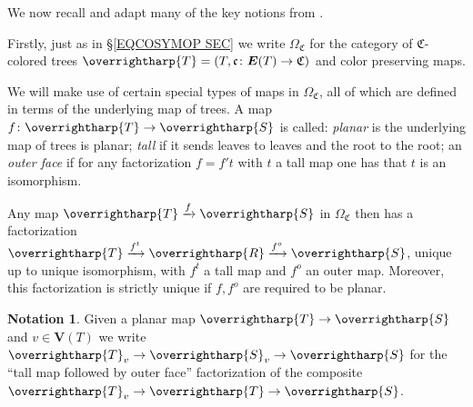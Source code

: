 \documentclass[a4paper,10pt
,draft
]{article}%
\numberwithin{equation}{section}
\numberwithin{figure}{section}
\theoremstyle{definition} %
\newtheorem{notation}[equation]{Notation}%
\newcommand{\vect}[1]{\text{\overrightharp{\ensuremath{#1}}}}
\newcommand{\1}{\ensuremath{\mathbbm 1}}%
\begin{document}
We now recall and adapt many 
of the key notions from \cite{BP_geo}.

Firstly, just as in \S \ref{EQCOSYMOP SEC}
we write 
$\Omega_{\mathfrak{C}}$
for the category of 
$\mathfrak{C}$-colored trees
$\vect{T} = (T,\mathfrak{c}\colon \boldsymbol{E}(T) \to \mathfrak{C})$
and color preserving maps.

We will make use of certain special types of maps in $\Omega_{\mathfrak{C}}$, all of which are defined in terms of the underlying map of trees.
A map $f \colon \vect{T} \to \vect{S}$
is called:
\emph{planar} is the underlying map of trees is planar;
\emph{tall} if it sends leaves to leaves and the root to the root;
an \emph{outer face}
if for any factorization 
$f = f' t$ with $t$ a tall map one has that $t$ is an isomorphism. 

Any map $\vect{T} \xrightarrow{f} \vect{S}$ in $\Omega_{\mathfrak{C}}$
then has a factorization
$\vect{T} \xrightarrow{f^t} \vect{R} \xrightarrow{f^o} \vect{S}$,
unique up to unique isomorphism,
with $f^t$ a tall map and $f^o$ an outer map.
Moreover, this factorization is strictly unique if $f,f^o$ are required to be planar.

\begin{notation}
	Given a planar map $\vect{T} \to \vect{S}$
	and $v \in \boldsymbol{V}(T)$
	we write
	$\vect{T}_v \to \vect{S}_v \to \vect{S}$
	for the ``tall map followed by outer face''
	factorization of the composite
	$\vect{T}_v \to \vect{T} \to \vect{S}$.
\end{notation}
\end{document}
